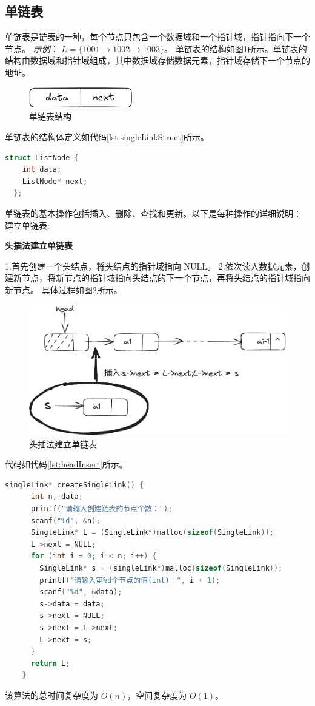 \documentclass[lang=cn,newtx,10pt,scheme=chinese]{../elegantbook}
\begin{document}
\subsection{单链表}
单链表是链表的一种，每个节点只包含一个数据域和一个指针域，指针指向下一个节点。
\textit{示例}：
$L = \{1001 \rightarrow 1002 \rightarrow 1003\}$。
单链表的结构如图\ref{fig:singleLinkStruct}所示。单链表的结构由数据域和指针域组成，其中数据域存储数据元素，指针域存储下一个节点的地址。
\begin{figure}[!htbp]
  \centering
  \includegraphics[width=0.4\textwidth]{./figure/pdf/cropped/singleStruct.pdf}
  \caption{单链表结构}
  \label{fig:singleLinkStruct}
\end{figure}
单链表的结构体定义如代码\ref{lst:singleLinkStruct}所示。
\begin{lstlisting}[language=C++, caption={单链表结构体定义}, label={lst:singleLinkStruct}]
  struct ListNode {
    int data;
    ListNode* next;
  };
\end{lstlisting}
单链表的基本操作包括插入、删除、查找和更新。以下是每种操作的详细说明：
建立单链表:

  \textbf{头插法建立单链表}

  1.首先创建一个头结点，将头结点的指针域指向 NULL。
  2.依次读入数据元素，创建新节点，将新节点的指针域指向头结点的下一个节点，再将头结点的指针域指向新节点。
  具体过程如图\ref{fig:headInsert}所示。
  \begin{figure}[!htbp]
    \centering
    \includegraphics[width=1\textwidth]{./figure/pdf/cropped/headInsert.pdf}
    \caption{头插法建立单链表}
    \label{fig:headInsert}
  \end{figure}
  代码如代码\ref{lst:headInsert}所示。
  \begin{lstlisting}[language=C++, caption={头插法建立单链表示例代码}, label={lst:headInsert}]
    singleLink* createSingleLink() {
      int n, data;
      printf("请输入创建链表的节点个数：");
      scanf("%d", &n);
      SingleLink* L = (SingleLink*)malloc(sizeof(SingleLink));
      L->next = NULL;
      for (int i = 0; i < n; i++) {
        SingleLink* s = (singleLink*)malloc(sizeof(SingleLink));
        printf("请输入第%d个节点的值(int)：", i + 1);
        scanf("%d", &data);
        s->data = data;
        s->next = NULL;
        s->next = L->next;
        L->next = s;
      }
      return L;
    }
    \end{lstlisting}
    该算法的总时间复杂度为 $O(n)$，空间复杂度为 $O(1)$。
\end{document}
